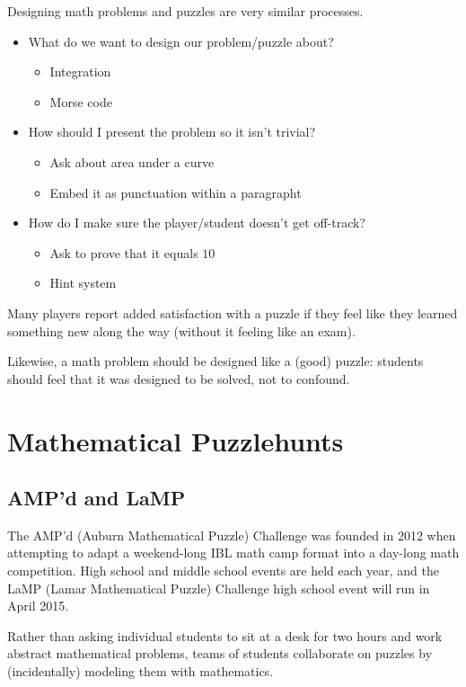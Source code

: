 \documentclass{beamer}
\theoremstyle{theorem}
\theoremstyle{definition}
\newcommand{\<}{\langle}
\renewcommand{\>}{\rangle}
\newcommand{\vpause}{\pause\vspace{1em}}
\begin{document}
\begin{frame}
  Designing math problems and puzzles are very similar processes.

  \pause

  \begin{itemize}
    \item What do we want to design our problem/puzzle about?
      \begin{itemize}
        \item Integration
        \item Morse code
      \end{itemize}
    \pause
    \item How should I present the problem so it isn't trivial?
      \begin{itemize}
        \item Ask about area under a curve
        \item Embed it as punctuation within a paragrapht
      \end{itemize}
    \pause
    \item How do I make sure the player/student doesn't get off-track?
      \begin{itemize}
        \item Ask to prove that it equals \(10\)
        \item Hint system
      \end{itemize}
  \end{itemize}
\end{frame}

\begin{frame}
  Many players report added satisfaction with a puzzle if they feel like they
  learned something new along the way (without it feeling like an exam).

  \vpause

  Likewise, a math problem should be designed like a (good) puzzle: students
  should feel that it was designed to be solved, not to confound.
\end{frame}

\section{Mathematical Puzzlehunts}

\subsection{AMP'd and LaMP}

\begin{frame}
  The AMP'd (Auburn Mathematical Puzzle) Challenge was founded in 2012
  when attempting to adapt a weekend-long IBL math camp format into
  a day-long math competition. High school and middle school events
  are held each year, and the LaMP (Lamar Mathematical Puzzle) Challenge
  high school event will run in April 2015.

  \vpause

  Rather than asking individual students to sit at a desk for two hours
  and work abstract mathematical problems, teams of students collaborate
  on puzzles by (incidentally) modeling them with mathematics.
\end{frame}
\end{document}
